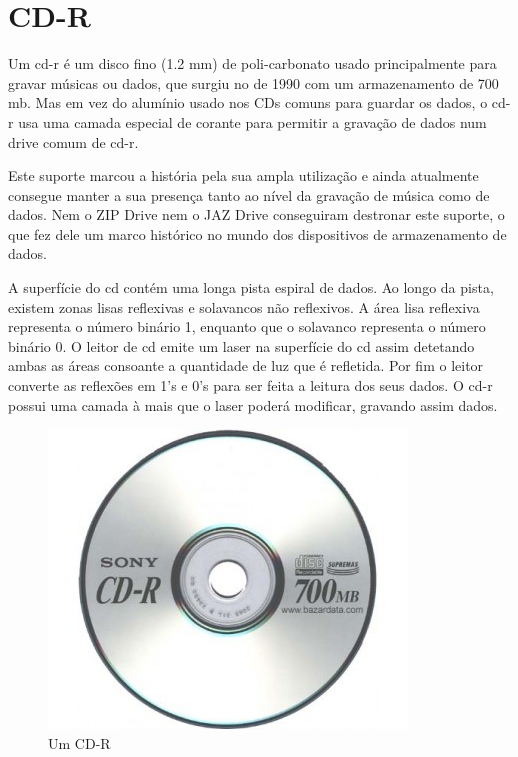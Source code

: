 \documentclass{report}
\begin{document}
\newpage
	

		\section{CD-R}
	
	Um \ac{cd-r} é um disco fino (1.2 mm) de poli-carbonato usado principalmente para gravar músicas ou dados, que surgiu no de 1990 com um armazenamento de 700 \ac{mb}. Mas em vez do alumínio usado nos CDs comuns para guardar os dados, o \ac{cd-r} usa uma camada especial de corante para permitir a gravação de dados num drive comum de \ac{cd-r}.
\vspace{1mm}

	Este suporte marcou a história pela sua ampla utilização e ainda atualmente consegue manter a sua presença tanto ao nível da gravação de música como de dados. Nem o ZIP Drive nem o JAZ Drive conseguiram destronar este suporte, o que fez dele um marco histórico no mundo dos dispositivos de armazenamento de dados.
\vspace{1mm}

	A superfície do \ac{cd} contém uma longa pista espiral de dados. Ao longo da pista, existem zonas lisas reflexivas e solavancos não reflexivos. A área lisa reflexiva representa o número binário 1, enquanto que o solavanco representa o número binário 0. O leitor de \ac{cd} emite um laser na superfície do \ac{cd} assim detetando ambas as áreas consoante a quantidade de luz que é refletida. Por fim o leitor converte as reflexões em 1's e 0's para ser feita a leitura dos seus dados. O \ac{cd-r} possui uma camada à mais que o laser poderá modificar, gravando assim dados.
\vspace{1mm}

	\begin{figure} [h]
		\centering
		\includegraphics[scale=0.4]{cd-r.jpg}
		\caption{Um CD-R}
	\end{figure}
\end{document}

